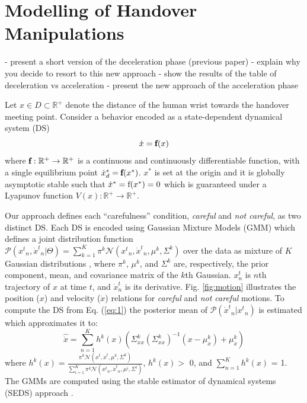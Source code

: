 \section{Modelling of Handover Manipulations}

- present a short version of the deceleration phase (previous paper)
- explain why you decide to resort to this new approach
- show the results of the table of deceleration vs acceleration
- present the new approach of the acceleration phase

Let $x \in D \subset \mathbb{R}^{+}$ denote the distance of the human wrist towards the handover meeting point. Consider a behavior encoded as a state-dependent dynamical system (DS)
%
\begin{equation}
\dot{x} = \pmb{\textnormal{f}}(x)
\label{eq:1}
\end{equation}
where $\pmb{\textnormal{f}}:\mathbb{R}^{+} \to \mathbb{R}^{+}$ is a continuous and continuously differentiable function, with a single equilibrium point ${\dot{x}_d}^* = \pmb{\textnormal{f}}(x^*)$. $x^{*}$ is set at the origin and it is globally asymptotic stable such that $\dot{x}^* = \textnormal{f}(x^{*}) = 0$ which is guaranteed under a Lyapunov function $V(x):\mathbb{R}^{+} \rightarrow \mathbb{R}^{+}$.

Our approach defines each ``carefulness'' condition, \textit{careful} and \textit{not careful}, as two distinct DS. Each DS is encoded using Gaussian Mixture Models (GMM) which defines a joint distribution function $\mathcal{P}({{x}^{t}}_n, {\dot{x}^{t}}_n | \Theta) = \sum_{k=1}^{K} \pi^{k} \mathcal{N}({{x}^{t}}_n, {\dot{x}^{t}}_n, \mu^{k}, \Sigma^{k})$ over the data as mixture of $K$ Gaussian distributions \cite{khansari2011learning}, where $\pi^{k}$, $\mu^{k}$, and $\Sigma^{k}$ are, respectively, the prior component, mean, and covariance matrix of the $k$th Gaussian. $x_n^t$ is $n$th trajectory of $x$ at time $t$, and $\dot{x}_n^t$ is its derivative. Fig. \ref{fig:motion} illustrates the position ($x$) and velocity ($\dot{x}$) relations for \textit{careful} and \textit{not careful} motions. To compute the DS from Eq. (\ref{eq:1}) the posterior mean of $\mathcal{P}({\dot{x}^{t}}_n|{{x}^{t}}_n)$ is estimated which approximates it to:
%
\begin{equation}
\hat{\dot{x}} = \sum_{n=1}^{K} h^{k}(x) (\Sigma^{k}_{\dot{x}x}(\Sigma^{k}_{xx})^{-1} (x - \mu^{k}_{x}) + \mu^{k}_{\dot{x}})
\label{eq:2}
\end{equation}
where $h^{k}(x) = \frac{\pi^{k} \mathcal{N}({{x}^{t}}, {\dot{x}^{t}}, \mu^{k}, \Sigma^{k})}{\sum_{i=1}^{K} \pi^{k} \mathcal{N}({{x}^{t}}_n, {\dot{x}^{t}}_n, \mu^{i}, \Sigma^{i})}$, $h^{k}(x) > $ 0, and $\sum_{n=1}^{K} h^{k}(x)$ = 1. The GMMs are computed using the stable estimator of dynamical systems (SEDS) approach \cite{khansari2011learning}. 

